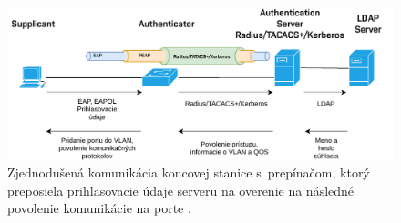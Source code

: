 \begin{figure}[H]
	\begin{center}
		\includegraphics[scale=0.75]{obrazky/dot1x.pdf}
	\end{center}
	\caption[Zjednodušený popis autentifikácie 802.1x]{Zjednodušená komunikácia koncovej stanice s~prepínačom, ktorý preposiela prihlasovacie údaje serveru na overenie na následné povolenie komunikácie na porte \cite{Vyncke2008}.}
	\label{fig:dot1x}
\end{figure}


